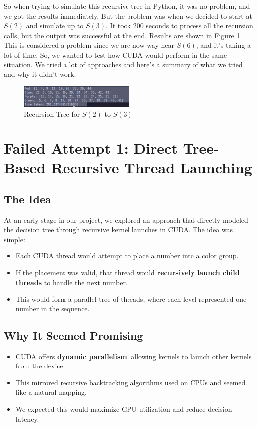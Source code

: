 \documentclass[12pt]{article}
\begin{document}
So when trying to simulate this recursive tree in Python, it was no problem, and we got the results immediately. But the problem was when we decided to start at $S(2)$ and simulate up to $S(3)$. It took 200 seconds to process all the recursion calls, but the output was successful at the end. Results are shown in Figure \ref{fig:pythontime}. \\ 
This is considered a problem since we are now way near $S(6)$, and it's taking a lot of time. So, we wanted to test how CUDA would perform in the same situation. We tried a lot of approaches and here's a summary of what we tried and why it didn't work.
\begin{figure}[h]
    \centering
    \includegraphics[width=0.5\textwidth]{images/pythonTime.png}
    \caption{Recursion Tree for $S(2)$ to $S(3)$}
    \label{fig:pythontime}
\end{figure}
\section{Failed Attempt 1: Direct Tree-Based Recursive Thread Launching}

\subsection*{The Idea}
At an early stage in our project, we explored an approach that directly modeled the decision tree through recursive kernel launches in CUDA. The idea was simple:
\begin{itemize}
    \item Each CUDA thread would attempt to place a number into a color group.
    \item If the placement was valid, that thread would \textbf{recursively launch child threads} to handle the next number.
    \item This would form a parallel tree of threads, where each level represented one number in the sequence.
\end{itemize}

\subsection*{Why It Seemed Promising}
\begin{itemize}
    \item CUDA offers \textbf{dynamic parallelism}, allowing kernels to launch other kernels from the device.
    \item This mirrored recursive backtracking algorithms used on CPUs and seemed like a natural mapping.
    \item We expected this would maximize GPU utilization and reduce decision latency.
\end{itemize}
\end{document}
